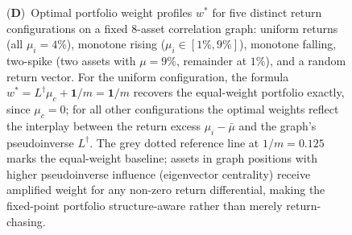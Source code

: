\begin{figure}[!htbp]
{    (\textbf{D})~Optimal portfolio weight profiles $w^*$ for five distinct return configurations on a fixed 8-asset correlation graph: uniform returns (all $\mu_i = 4\%$), monotone rising ($\mu_i \in [1\%, 9\%]$), monotone falling, two-spike (two assets with $\mu = 9\%$, remainder at $1\%$), and a random return vector.  For the uniform configuration, the formula $w^* = L^\dagger \mu_c + \mathbf{1}/m = \mathbf{1}/m$ recovers the equal-weight portfolio exactly, since $\mu_c = 0$; for all other configurations the optimal weights reflect the interplay between the return excess $\mu_i - \bar\mu$ and the graph's pseudoinverse $L^\dagger$.  The grey dotted reference line at $1/m = 0.125$ marks the equal-weight baseline; assets in graph positions with higher pseudoinverse influence (eigenvector centrality) receive amplified weight for any non-zero return differential, making the fixed-point portfolio structure-aware rather than merely return-chasing.}
    \label{fig:etf_panel_3}
\end{figure}

